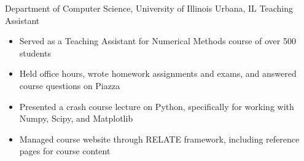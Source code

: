 
        {Department of Computer Science, University of Illinois}
        {Urbana, IL}
        {Teaching Assistant}
        {}{
    \begin{itemize}
        \item Served as a Teaching Assistant for Numerical Methods course of over 500 students
        \item Held office hours, wrote homework assignments and exams, and answered course questions on Piazza
        \item Presented a crash course lecture on Python, specifically for working with Numpy, Scipy, and Matplotlib
        \item Managed course website through RELATE framework, including reference pages for course content
    \end{itemize}
}
